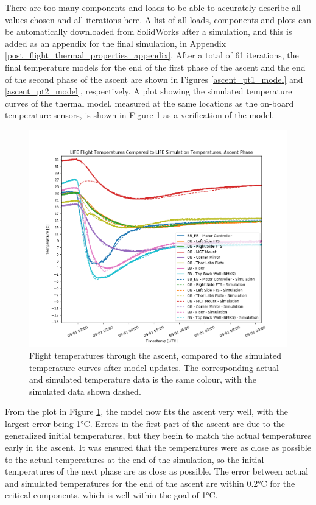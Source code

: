 There are too many components and loads to be able to accurately describe all values chosen and all iterations here. A list of all loads, components and plots can be automatically downloaded from SolidWorks after a simulation, and this is added as an appendix for the final simulation, in Appendix \ref{post_flight_thermal_properties_appendix}. After a total of 61 iterations, the final temperature models for the end of the first phase of the ascent and the end of the second phase of the ascent are shown in Figures \ref{ascent_pt1_model} and \ref{ascent_pt2_model}, respectively. A plot showing the simulated temperature curves of the thermal model, measured at the same locations as the on-board temperature sensors, is shown in Figure \ref{fig:ascent_temps_with_sims} as a verification of the model.

\begin{figure}
    \centering
    \includegraphics[width=\textwidth]{chap4_images/ascent_images/Ascent_temps_with_sims_V2.png}
    \caption{Flight temperatures through the ascent, compared to the simulated temperature curves after model updates. The corresponding actual and simulated temperature data is the same colour, with the simulated data shown dashed.}
    \label{fig:ascent_temps_with_sims}
\end{figure}

From the plot in Figure \ref{fig:ascent_temps_with_sims}, the model now fits the ascent very well, with the largest error being 1°C. Errors in the first part of the ascent are due to the generalized initial temperatures, but they begin to match the actual temperatures early in the ascent. It was ensured that the temperatures were as close as possible to the actual temperatures at the end of the simulation, so the initial temperatures of the next phase are as close as possible. The error between actual and simulated temperatures for the end of the ascent are within 0.2°C for the critical components, which is well within the goal of 1°C.

